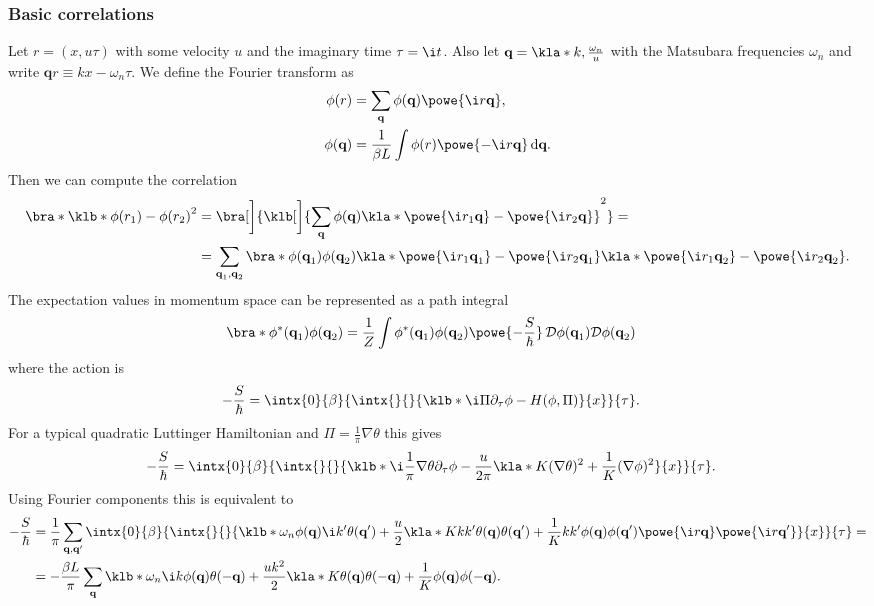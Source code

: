 \documentclass[english, parskip=full]{scrartcl}
\begin{document}
\subsubsection{Basic correlations}
Let $r=(x,u\tau)$ with some velocity $u$ and the imaginary time $\tau = \i t$.
Also let $\textbf{q} = \kla*{k, \frac{\omega_n}{u}}$ with the Matsubara frequencies $\omega_n$ and write $\textbf{q}r \equiv kx - \omega_n \tau$.
We define the Fourier transform as
\begin{align}
\phi(r) &= \sum_\textbf{q} \phi(\textbf{q}) \powe{\i r\textbf{q}},\\
\phi(\textbf{q}) &= \frac{1}{\beta L} \int \phi(r) \powe{-\i r\textbf{q}} \,\mathrm{d}\textbf{q}.
\end{align}
Then we can compute the correlation
\begin{align}
\bra*{\klb*{\phi(r_1) - \phi(r_2)}^2} &= \bra[\bigg]{ \klb[\bigg]{\sum_{\textbf{q} } \phi(\textbf{q}) \kla*{\powe{\i r_1\textbf{q}} - \powe{\i r_2\textbf{q}}}}^2   } = \\
&= \sum_{\textbf{q}_1,\textbf{q}_2} \bra*{\phi(\textbf{q}_1) \phi(\textbf{q}_2)}  \kla*{\powe{\i r_1\textbf{q}_1} - \powe{\i r_2\textbf{q}_1}} \kla*{\powe{\i r_1\textbf{q}_2} - \powe{\i r_2\textbf{q}_2}}.
\end{align}
The expectation values in momentum space can be represented as a path integral
\begin{align}
\bra*{\phi^\ast(\textbf{q}_1) \phi(\textbf{q}_2)} &= \frac{1}{Z} \int \phi^\ast(\textbf{q}_1) \phi(\textbf{q}_2) \powe{-\frac{S}{\hbar}} \,\mathcal{D}\phi(\textbf{q}_1) \mathcal{D}\phi(\textbf{q}_2)
\end{align}
where the action is
\begin{align}
-\frac{S}{\hbar} &= \intx{0}{\beta}{ \intx{ }{ }{ \klb*{\i\Pi \partial_\tau \phi - H(\phi,\Pi)}  }{x}}{\tau}.
\end{align}
For a typical quadratic Luttinger Hamiltonian and $\Pi = \frac{1}{\pi} \nabla \theta$ this gives
\begin{align}
-\frac{S}{\hbar} &= \intx{0}{\beta}{ \intx{ }{ }{ \klb*{\i\frac{1}{\pi} \nabla\theta \partial_\tau \phi - \frac{u}{2\pi} \kla*{K(\nabla\theta)^2 + \frac{1}{K} (\nabla\phi)^2} }  }{x}}{\tau}.
\end{align}
Using Fourier components this is equivalent to
\begin{align}
-\frac{S}{\hbar} &= \frac{1}{\pi}\sum_{\textbf{q},\textbf{q}'} \intx{0}{\beta}{\intx{ }{ }{ \klb*{ \omega_n \phi(\textbf{q}) \i k' \theta(\textbf{q}')  + \frac{u}{2} \kla*{K k k' \theta(\textbf{q}) \theta(\textbf{q}') + \frac{1}{K} kk' \phi(\textbf{q}) \phi(\textbf{q}')  }   } \powe{\i r\textbf{q}} \powe{\i r\textbf{q}'} }{x}}{\tau} = \\
&= -\frac{\beta L}{\pi} \sum_{\textbf{q}} \klb*{\omega_n \i k\phi(\textbf{q}) \theta(-\textbf{q}) + \frac{uk^2}{2} \kla*{K \theta(\textbf{q}) \theta(-\textbf{q}) + \frac{1}{K} \phi(\textbf{q}) \phi(-\textbf{q})} }.
\end{align}
\end{document}
